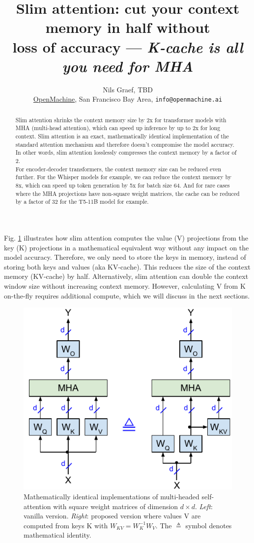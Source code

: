 \documentclass{article}
\title{Slim attention: cut your context memory in half without \\ loss of accuracy --- \emph{K-cache is all you need for MHA}}
\author{Nils Graef, TBD \\
  \href{https://openmachine.ai}{OpenMachine}, San Francisco Bay Area, \texttt{info@openmachine.ai}}
\numberwithin{equation}{section} %
\begin{document}
 \maketitle

\begin{abstract}
Slim attention shrinks the context memory size by 2x for transformer models with MHA (multi-head attention), which can speed up inference by up to 2x for long context. Slim attention is an exact, mathematically identical implementation of the standard attention mechanism and therefore doesn’t compromise the model accuracy. In other words, slim attention losslessly compresses the context memory by a factor of 2. \\
For encoder-decoder transformers, the context memory size can be reduced even further. For the Whisper models for example, we can reduce the context memory by 8x, which can speed up token generation by 5x for batch size 64. And for rare cases where the MHA projections have non-square weight matrices, the cache can be reduced by a factor of 32 for the T5-11B model for example.
\end{abstract}

Fig. \ref{fig1} illustrates how slim attention computes the value (V) projections from the key (K) projections in a mathematical equivalent way without any impact on the model accuracy. Therefore, we only need to store the keys in memory, instead of storing both keys and values (aka KV-cache). This reduces the size of the context memory (KV-cache) by half. Alternatively, slim attention can double the context window size without increasing context memory. However, calculating V from K on-the-fly requires additional compute, which we will discuss in the next sections.
\begin{figure}[h!] \centering  %
  \includegraphics[scale=0.9]{figs/slim_fig1.pdf}
  \caption{Mathematically identical implementations of multi-headed self-attention with square weight matrices of dimension $d \times d$. \emph{Left}: vanilla version. \emph{Right}: proposed version where values V are computed from keys K with $W_{KV} = W_K^{-1} W_V$. The $\triangleq$ symbol denotes mathematical identity.}
\label{fig1} \end{figure}
\end{document}
